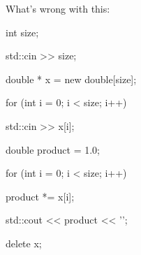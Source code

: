 What's wrong with this:



\begin{consolethree}[escapeinside=||]

int size;

std::cin >> size;

double * x = new double[size];

for (int i = 0; i < size; i++)

{

    std::cin >> x[i];

}

double product = 1.0;

for (int i = 0; i < size; i++)

{

    product *= x[i];

    std::cout << product << '\n';

}

delete x;

\end{consolethree}

